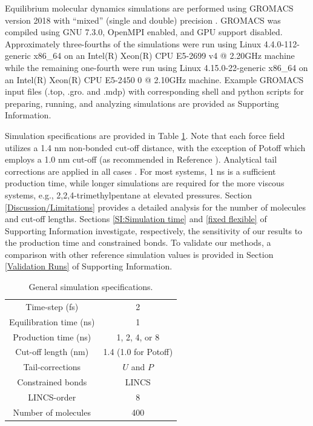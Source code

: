 \documentclass[preprint,review,12pt]{elsarticle}
\begin{document}
	Equilibrium molecular dynamics simulations are performed using GROMACS version 2018 with ``mixed'' (single and double) precision \cite{GROMACS_2018}. GROMACS was compiled using GNU 7.3.0, OpenMPI enabled, and GPU support disabled. Approximately three-fourths of the simulations were run using Linux 4.4.0-112-generic x86\_64 on an Intel(R) Xeon(R) CPU E5-2699 v4 @ 2.20GHz machine while the remaining one-fourth were run using Linux 4.15.0-22-generic x86\_64 on an Intel(R) Xeon(R) CPU E5-2450 0 @ 2.10GHz machine. Example GROMACS input files (.top, .gro. and .mdp) with corresponding shell and python scripts for preparing, running, and analyzing simulations are provided as Supporting Information. 
	
	
	Simulation specifications are provided in Table \ref{tab:sim_specs}. Note that each force field utilizes a 1.4 nm non-bonded cut-off distance, with the exception of Potoff which employs a 1.0 nm cut-off (as recommended in Reference ). Analytical tail corrections are applied in all cases \cite{GROMACS_note}. For most systems, 1 ns is a sufficient production time, while longer simulations are required for the more viscous systems, e.g., 2,2,4-trimethylpentane at elevated pressures. Section \ref{Discussion/Limitations} provides a detailed analysis for the number of molecules and cut-off lengths. Sections \ref{SI:Simulation time} and \ref{fixed flexible} of Supporting Information investigate, respectively, the sensitivity of our results to the production time and constrained bonds. To validate our methods, a comparison with other reference simulation values \cite{NIST_SRSW,Kioupis2000,Nieto2006} is provided in Section \ref{Validation Runs} of Supporting Information. 

	 
	\begin{table}[htb!]
		\caption{General simulation specifications.} \label{tab:sim_specs}
		\begin{center}
			\begin{tabular}{|c|c|}
				\hline
				Time-step (fs) & 2 \\
				Equilibration time (ns) & 1 \\
				Production time (ns) & 1, 2, 4, or 8 \\
				Cut-off length (nm) & 1.4 (1.0 for Potoff) \\
				Tail-corrections & $U$ and $P$ \\
				Constrained bonds & LINCS \cite{GROMACS_2018} \\
				LINCS-order & 8 \\			     
				Number of molecules & 400 \\
				\hline        
			\end{tabular}
		\end{center}
	\end{table}
	
\end{document}
